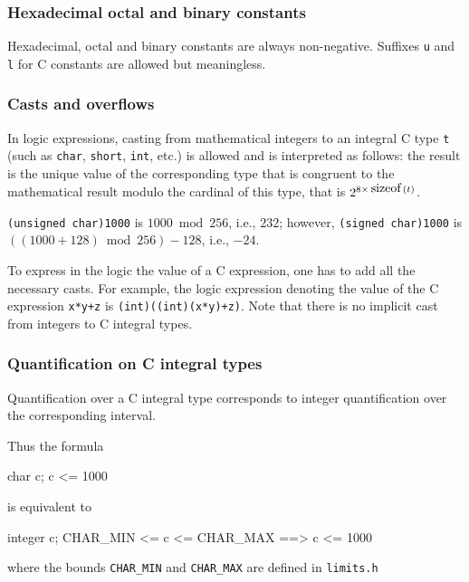 \subsubsection{Hexadecimal octal and binary constants}

Hexadecimal, octal and binary constants are always non-negative. Suffixes
\texttt{u} and \texttt{l} for C constants are allowed but meaningless.

\subsubsection{Casts and  overflows}

In logic expressions, casting from mathematical integers
to an integral C type \lstinline|t| (such as \lstinline|char|,
\lstinline|short|, \lstinline|int|, etc.) is allowed and is
interpreted as follows: the result is the unique value of the
corresponding type that is congruent to the mathematical result modulo
the cardinal of this type, that is $2^{8\times\sizeof(t)}$.
\begin{example}
  \lstinline|(unsigned char)1000| is $1000 \bmod 256$, i.e., $232$;
  however, \lstinline|(signed char)1000| is $((1000+128) \bmod 256) - 128$, i.e., $-24$.
\end{example}

To express in the logic the value of a C
expression, one has to add all the necessary casts. For
example, the logic expression denoting the value of the C expression
\lstinline|x*y+z| is \lstinline|(int)((int)(x*y)+z)|.
Note that there is no implicit cast from integers to C integral types.


\subsubsection{Quantification on C integral types}
\label{sec:quantification}

Quantification over a C integral type corresponds to integer
quantification over the corresponding interval.
\begin{example}
Thus the formula
\begin{listing-nonumber}
\forall char c; c <= 1000
\end{listing-nonumber}
is equivalent to
\begin{listing-nonumber}
\forall integer c; CHAR_MIN <= c <= CHAR_MAX ==> c <= 1000
\end{listing-nonumber}
where the bounds \verb|CHAR_MIN| and \verb|CHAR_MAX| are defined
in \verb|limits.h|
\end{example}



